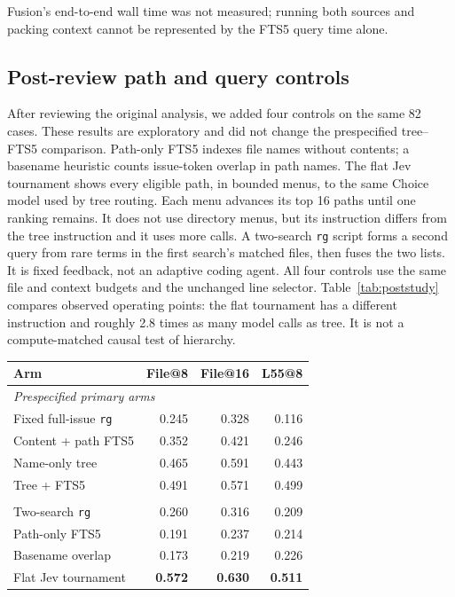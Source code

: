 \documentclass[
]{article}
\begin{document}
Fusion's end-to-end wall time was not measured; running both
sources and packing context cannot be represented by the FTS5 query time
alone.

\subsection{Post-review path and query controls}
\label{post-review-controls}

After reviewing the original analysis, we added four controls on the
same 82 cases. These results are exploratory and did not change the
prespecified tree--FTS5 comparison. Path-only FTS5 indexes file names
without contents; a basename heuristic counts issue-token overlap in
path names. The flat Jev tournament shows every eligible path, in
bounded menus, to the same Choice model used by tree routing. Each
menu advances its top 16 paths until one ranking remains. It does not
use directory menus, but its instruction differs from the tree
instruction and it uses more calls. A two-search \texttt{rg} script
forms a second query from rare terms in the first search's matched
files, then fuses the two lists. It is fixed feedback, not an adaptive
coding agent. All four controls use the same file and context budgets
and the unchanged line selector. Table~\ref{tab:poststudy} compares
observed operating points: the flat tournament has a different
instruction and roughly 2.8 times as many model calls as tree. It is
not a compute-matched causal test of hierarchy.

\label{tab:poststudy}
\begin{center}\small
\begin{tabular}{lrrr}
\toprule
Arm & File@8 & File@16 & L55@8 \\
\midrule
\multicolumn{4}{l}{\textit{Prespecified primary arms}} \\
Fixed full-issue \texttt{rg} & 0.245 & 0.328 & 0.116 \\
Content + path FTS5 & 0.352 & 0.421 & 0.246 \\
Name-only tree & 0.465 & 0.591 & 0.443 \\
Tree + FTS5 & 0.491 & 0.571 & 0.499 \\
\addlinespace[3pt]
\multicolumn{4}{l}{\textit{Exploratory post-study controls}} \\
Two-search \texttt{rg} & 0.260 & 0.316 & 0.209 \\
Path-only FTS5 & 0.191 & 0.237 & 0.214 \\
Basename overlap & 0.173 & 0.219 & 0.226 \\
Flat Jev tournament & \textbf{0.572} & \textbf{0.630} & \textbf{0.511} \\
\bottomrule
\end{tabular}
\end{center}
\end{document}
